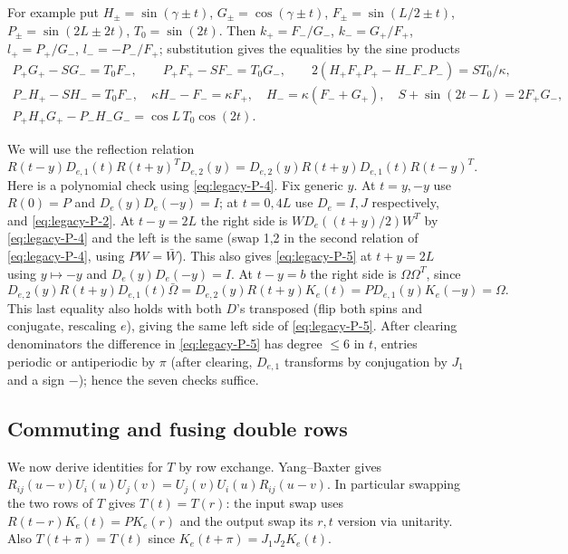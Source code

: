 For example put $H_\pm=\sin(\gamma\pm t)$, $G_\pm=\cos(\gamma\pm t)$, $F_\pm=\sin(L/2\pm t)$, $P_\pm=\sin(2L\pm2t)$, $T_0=\sin(2t)$. Then $k_+=F_-/G_-$, $k_-=G_+/F_+$, $l_+=P_+/G_-$, $l_-=-P_-/F_+$; substitution gives the equalities by the sine products
\[
\begin{gathered}
 P_+ G_+-S G_-=T_0 F_-,\qquad P_+F_+-S F_-=T_0 G_-,\qquad
 2(H_+ F_+ P_+ -H_-F_-P_-)= S T_0/\kappa,\\
 P_- H_+-S H_-=T_0 F_-,\quad \kappa H_- -F_-=\kappa F_+,\quad H_-=\kappa(F_-+G_+),\quad
 S+\sin(2t-L)=2F_+G_-,\\
 P_+ H_+ G_+-P_- H_- G_-=\cos L\,T_0\cos(2t).
\end{gathered}
\]

We will use the reflection relation
\begin{equation}
 R(t-y) D_{e,1}(t) R(t+y)^T D_{e,2}(y)
 =D_{e,2}(y)R(t+y)D_{e,1}(t)R(t-y)^T.                            \label{eq:legacy-P-5}
\end{equation}
Here is a polynomial check using \eqref{eq:legacy-P-4}. Fix generic $y$. At $t=y,-y$ use $R(0)=P$ and $D_e(y)\allowbreak D_e(-y)=I$; at $t=0,4L$ use $D_e=I,J$ respectively, and \eqref{eq:legacy-P-2}. At $t-y=2L$ the right side is $W D_e((t+y)/2)W^T$ by \eqref{eq:legacy-P-4} and the left is the same (swap 1,2 in the second relation of \eqref{eq:legacy-P-4}, using $PW=\bar W$). This also gives \eqref{eq:legacy-P-5} at $t+y=2L$ using $y\mapsto-y$ and $D_e(y)D_e(-y)=I$. At $t-y=b$ the right side is $\Omega \Omega^T$, since
\[
 D_{e,2}(y) R(t+y)D_{e,1}(t)\bar\Omega
 =D_{e,2}(y)R(t+y)K_e(t)
 =P D_{e,1}(y)K_e(-y)=\Omega .
\]
This last equality also holds with both $D$'s transposed (flip both spins and conjugate, rescaling $e$), giving the same left side of \eqref{eq:legacy-P-5}. After clearing denominators the difference in \eqref{eq:legacy-P-5} has degree $\le 6$ in $t$, entries periodic or antiperiodic by $\pi$ (after clearing, $D_{e,1}$ transforms by conjugation by $J_1$ and a sign $-$); hence the seven checks suffice.

\subsection{Commuting and fusing double rows}\label{sec:strip-double-row-identities}
We now derive identities for $T$ by row exchange. Yang--Baxter gives
$R_{ij}(u-v) U_i(u)U_j(v)=U_j(v)U_i(u) R_{ij}(u-v)$. In particular swapping the two rows of $T$ gives $T(t)=T(r)$: the input swap uses $R(t-r)K_e(t)=P K_e(r)$ and the output swap its $r,t$ version via unitarity. Also $T(t+\pi)=T(t)$ since $K_e(t+\pi)=J_1 J_2 K_e(t)$.

